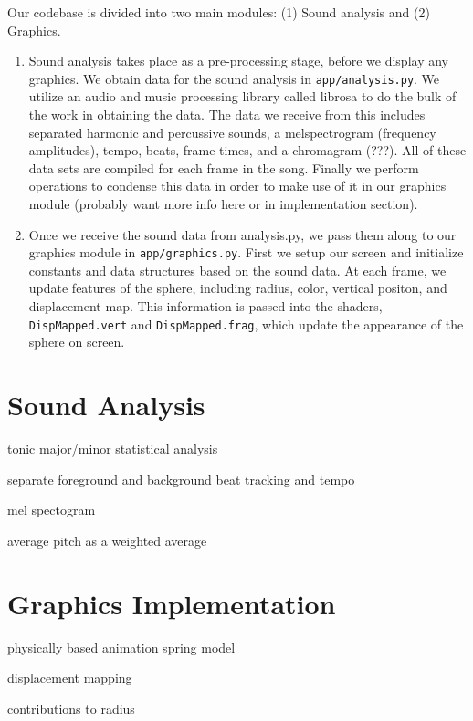 \documentclass{article}
\newcommand{\code}{\texttt}
\begin{document}
Our codebase is divided into two main modules: (1) Sound analysis and (2) Graphics. 

\begin{enumerate}[(1)]

\item  Sound analysis takes place as a pre-processing stage, before we display any graphics. We obtain data for the sound analysis in \code{app/analysis.py}. We utilize an audio and music processing library called librosa to do the bulk of the work in obtaining the data. The data we receive from this includes separated harmonic and percussive sounds, a melspectrogram (frequency amplitudes), tempo, beats, frame times, and a chromagram (???). All of these data sets are compiled for each frame in the song. Finally we perform operations to condense this data in order to make use of it in our graphics module (probably want more info here or in implementation section).

\item Once we receive the sound data from analysis.py, we pass them along to our graphics module in \code{app/graphics.py}. First we setup our screen and initialize constants and data structures based on the sound data. At each frame, we update features of the sphere, including radius, color, vertical positon, and displacement map. This information is passed into the shaders, \code{DispMapped.vert} and \code{DispMapped.frag}, which update the appearance of the sphere on screen. 

\end{enumerate}

\section{Sound Analysis}

tonic
major/minor
statistical analysis

separate foreground and background
beat tracking and tempo

mel spectogram

average pitch as a weighted average


\section{Graphics Implementation}

physically based animation spring model

displacement mapping

contributions to radius
\end{document}
